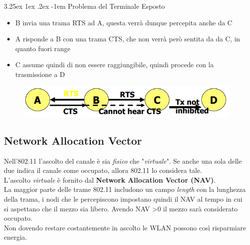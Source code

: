 \documentclass{article}
\makeatletter
\renewcommand\paragraph{\@startsection{paragraph}{5}{\z@}%
  {3.25ex \@plus1ex \@minus.2ex}%
  {-1em}%
  {\normalfont\normalsize\bfseries}}
\makeatother
\begin{document}
                    \paragraph{Problema del Terminale Esposto}
                        \begin{itemize}
                            \item B invia una trama RTS ad A, questa verrà dunque percepita anche da C
                            \item A risponde a B con una trama CTS, che non verrà però sentita da da C, in quanto fuori range
                            \item C assume quindi di non essere raggiungibile, quindi procede con la trasmissione a D
                        \end{itemize}
                        \begin{figure}[H]
                            \centering
                            \includegraphics[width=\textwidth]{pic/esposto_cts_rst.png}
                            \label{Soluzione al Terminale Esposto con RTS/CTS}
                        \end{figure}

        \subsection{Network Allocation Vector}
            Nell'802.11 l'ascolto del canale è sia \textit{fisico} che "\textit{virtuale}". Se anche una sola delle due indica il canale come occupato, allora 802.11 lo considera tale.\\
            L'ascolto \textit{virtuale} è fornito dal \textbf{Network Allocation Vector (NAV)}.\\
            La maggior parte delle trame 802.11 includono un campo \textit{length} con la lunghezza della trama, i nodi che le percepiscono impostano quindi il NAV al tempo in cui si aspettano che il mezzo sia libero. Avendo NAV >0 il mezzo sarà considerato occupato.\\
            Non dovendo restare costantemente in ascolto le WLAN possono così risparmiare energia.
\end{document}
